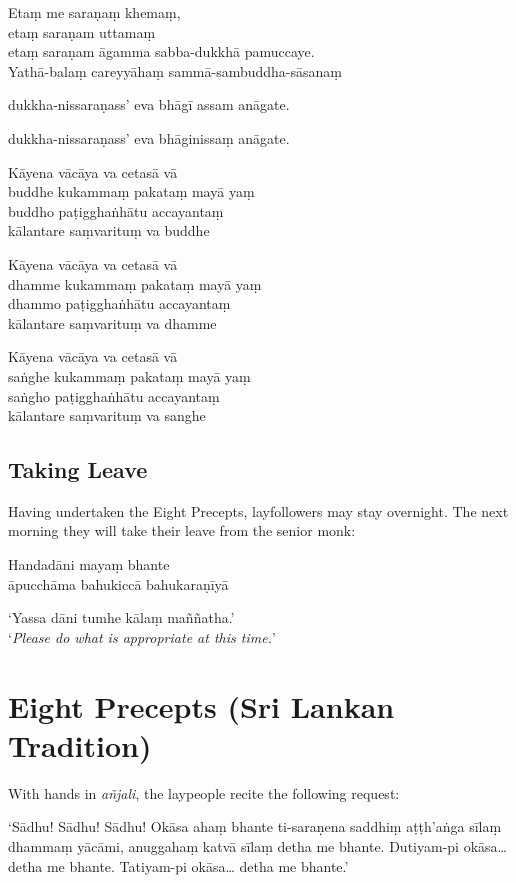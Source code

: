 Etaṃ me saraṇaṃ khemaṃ,\\
etaṃ saraṇam uttamaṃ\\
etaṃ saraṇam āgamma sabba-dukkhā pamuccaye.\\
Yathā-balaṃ careyyāhaṃ sammā-sambuddha-sāsanaṃ

%
dukkha-nissaraṇass' eva bhāgī assam anāgate.

%
dukkha-nissaraṇass' eva bhāginissaṃ anāgate.

Kāyena vācāya va cetasā vā\\
buddhe kukammaṃ pakataṃ mayā yaṃ\\
buddho paṭigghaṅhātu accayantaṃ\\
kālantare saṃvarituṃ va buddhe

Kāyena vācāya va cetasā vā\\
dhamme kukammaṃ pakataṃ mayā yaṃ\\
dhammo paṭigghaṅhātu accayantaṃ\\
kālantare saṃvarituṃ va dhamme

Kāyena vācāya va cetasā vā\\
saṅghe kukammaṃ pakataṃ mayā yaṃ\\
saṅgho paṭigghaṅhātu accayantaṃ\\
kālantare saṃvarituṃ va sanghe

\subsection{Taking Leave}

Having undertaken the Eight Precepts, layfollowers may stay overnight. The next
morning they will take their leave from the senior monk:


Handadāni mayaṃ bhante\\
āpucchāma bahukiccā bahukaraṇīyā


‘Yassa dāni tumhe kālaṃ maññatha.’\\
‘\emph{Please do what is appropriate at this time.}’

\section{Eight Precepts (Sri Lankan Tradition)}

With hands in \emph{añjali}, the laypeople recite the following request:

‘Sādhu! Sādhu! Sādhu! Okāsa ahaṃ bhante ti-saraṇena saddhiṃ aṭṭh'aṅga sīlaṃ
dhammaṃ yācāmi, anuggahaṃ katvā sīlaṃ detha me bhante. Dutiyam-pi okāsa… detha
me bhante. Tatiyam-pi okāsa… detha me bhante.’

